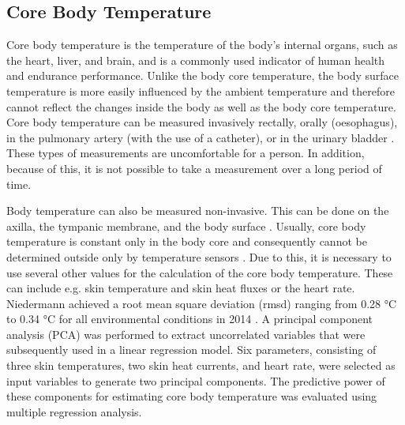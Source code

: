 \subsection{Core Body Temperature}
Core body temperature is the temperature of the body's internal organs, such as the heart, liver, and brain, and is a commonly used indicator of human health and endurance performance.
Unlike the body core temperature, the body surface temperature is more easily influenced by the ambient temperature and therefore cannot reflect the changes inside the body as well as the body core temperature.
Core body temperature can be measured invasively rectally, orally (oesophagus), in the pulmonary artery (with the use of a catheter), or in the urinary bladder \cite{moranCoreTemperatureMeasurement2002a}.
These types of measurements are uncomfortable for a person. 
In addition, because of this, it is not possible to take a measurement over a long period of time.

Body temperature can also be measured non-invasive.
This can be done on the axilla, the tympanic membrane, and the body surface \cite{moranCoreTemperatureMeasurement2002a}.
Usually, core body temperature is constant only in the body core and consequently cannot be determined outside only by temperature sensors \cite{niedermannPredictionHumanCore2014}.
Due to this, it is necessary to use several other values for the calculation of the core body temperature. 
These can include e.g. skin temperature and skin heat fluxes or the heart rate.
Niedermann achieved a root mean square deviation (rmsd) ranging from 0.28 °C to 0.34 °C for all environmental conditions in 2014 \cite{niedermannPredictionHumanCore2014}.
A principal component analysis (PCA) was performed to extract uncorrelated variables that were subsequently used in a linear regression model. 
Six parameters, consisting of three skin temperatures, two skin heat currents, and heart rate, were selected as input variables to generate two principal components. 
The predictive power of these components for estimating core body temperature was evaluated using multiple regression analysis.

